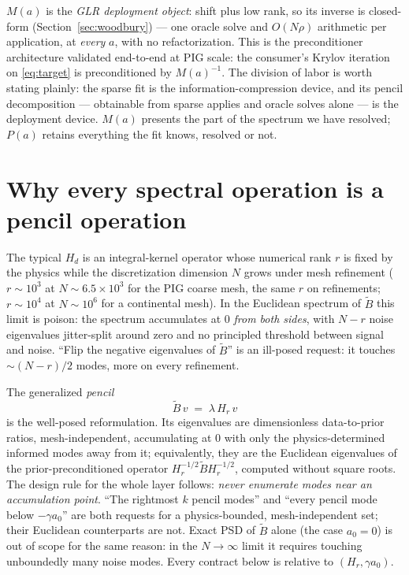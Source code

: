 \documentclass[11pt]{article}
\newcommand{\Bt}{\widetilde{B}}
\newcommand{\Hd}{H_d}
\newcommand{\Hr}{H_r}
\begin{document}
$M(a)$ is the \emph{GLR deployment object}: shift plus low rank, so its
inverse is closed-form (Section~\ref{sec:woodbury}) --- one oracle solve
and $O(N\rho)$ arithmetic per application, at \emph{every} $a$, with no
refactorization. This is the preconditioner architecture validated
end-to-end at PIG scale: the consumer's Krylov iteration on
\eqref{eq:target} is preconditioned by $M(a)^{-1}$. The division of labor
is worth stating plainly: the sparse fit is the information-compression
device, and its pencil decomposition --- obtainable from sparse applies
and oracle solves alone --- is the deployment device. $M(a)$ presents the
part of the spectrum we have resolved; $P(a)$ retains everything the fit
knows, resolved or not.

\section{Why every spectral operation is a pencil operation}
\label{sec:pencil}

The typical $\Hd$ is an integral-kernel operator whose numerical rank $r$
is fixed by the physics while the discretization dimension $N$ grows under
mesh refinement ($r \sim 10^3$ at $N \sim 6.5 \times 10^3$ for the PIG
coarse mesh, the same $r$ on refinements; $r \sim 10^4$ at $N \sim 10^6$
for a continental mesh). In the Euclidean spectrum of $\Bt$ this limit is
poison: the spectrum accumulates at $0$ \emph{from both sides}, with
$N - r$ noise eigenvalues jitter-split around zero and no principled
threshold between signal and noise. ``Flip the negative eigenvalues of
$\Bt$'' is an ill-posed request: it touches $\sim (N-r)/2$ modes, more on
every refinement.

The generalized \emph{pencil}
\begin{equation}
  \Bt\, v \;=\; \lambda\, \Hr\, v
  \label{eq:pencil}
\end{equation}
is the well-posed reformulation. Its eigenvalues are dimensionless
data-to-prior ratios, mesh-independent, accumulating at $0$ with only the
physics-determined informed modes away from it; equivalently, they are the
Euclidean eigenvalues of the prior-preconditioned operator
$\Hr^{-1/2} \Bt \Hr^{-1/2}$, computed without square roots. The design
rule for the whole layer follows: \emph{never enumerate modes near an
accumulation point}. ``The rightmost $k$ pencil modes'' and ``every pencil
mode below $-\gamma a_0$'' are both requests for a physics-bounded,
mesh-independent set; their Euclidean counterparts are not. Exact PSD of
$\Bt$ alone (the case $a_0 = 0$) is out of scope for the same reason: in
the $N \to \infty$ limit it requires touching unboundedly many noise
modes. Every contract below is relative to $(\Hr, \gamma a_0)$.
\end{document}
